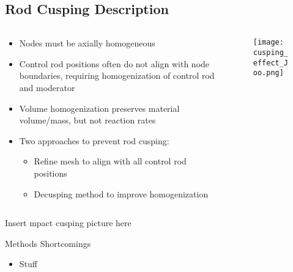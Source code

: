 \subsection{Rod Cusping Description}
\begin{frame}

\begin{columns}
\begin{column}{0.6\textwidth}
    \begin{itemize}
        \item Nodes must be axially homogeneous
        \item Control rod positions often do not align with node boundaries, 
        requiring homogenization of control rod and moderator
        \item Volume homogenization preserves material volume/mass, but not 
        reaction rates
        \item Two approaches to prevent rod cusping:
        \begin{itemize}
          \item Refine mesh to align with all control rod positions
          \item Decusping method to improve homogenization
        \end{itemize}
    \end{itemize}
\end{column}
\begin{column}{0.4\textwidth}
\begin{figure}[h]
  \centering
  \texttt{[image: cusping\_effect\_Joo.png]}
\end{figure} 
\end{column}
\end{columns}
    
\end{frame}


\begin{frame}
    
    Insert mpact cusping picture here
    
\end{frame}


\begin{frame}[t]{Methods Shortcomings}
    
    \begin{itemize}
        \item Stuff
    \end{itemize}

\end{frame}